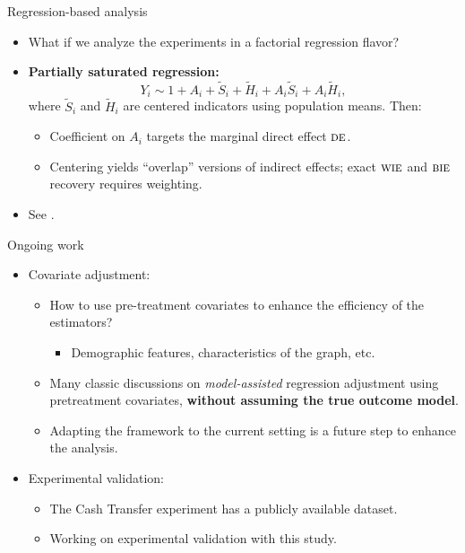 \documentclass[aspectratio=169]{beamer}
\newcommand{\de}{\textsc{de}}
\newcommand{\bie}{\textsc{bie}}
\newcommand{\wie}{\textsc{wie}}
\begin{document}
\begin{frame}{Regression-based analysis}
\begin{itemize}
    \item What if we analyze the experiments in a factorial regression flavor? 
    \pause 
    \item \textbf{Partially saturated regression:}
  \[
    Y_i \sim 1 + A_i + \tilde S_i + \tilde H_i + A_i\tilde S_i + A_i \tilde H_i,
  \]
  where \(\tilde S_i\) and \(\tilde H_i\) are centered indicators using population means. Then:
  \begin{itemize}
  \pause 
    \item Coefficient on \(A_i\) targets the marginal direct effect $\de$.
  \pause 
    \item Centering yields ``overlap'' versions of indirect effects; exact $\wie$ and $\bie$ recovery requires weighting.
  \end{itemize}
  \pause 
  \item See \citet{zhao2022regression, aronow2017estimating}.
\end{itemize}
  
\end{frame}

\begin{frame}{Ongoing work}
\begin{itemize}
    \item Covariate adjustment: 
    \begin{itemize}
    \pause 
        \item How to use pre-treatment covariates to enhance the efficiency of the estimators?
        \begin{itemize}
            \item Demographic features, characteristics of the graph, etc.
        \end{itemize}
    \pause 
        \item Many classic discussions on \textit{model-assisted} regression adjustment using pretreatment covariates, \textbf{without assuming the true outcome model}.
    \pause 
        \item Adapting the framework to the current setting is a future step to enhance the analysis.

    \end{itemize}
    \pause 

    \item Experimental validation:
    \begin{itemize}
    \pause
        \item The Cash Transfer experiment has a publicly available dataset.
    \pause 
        \item Working on experimental validation with this study.
    \end{itemize}
\end{itemize}
    
\end{frame}
\end{document}
